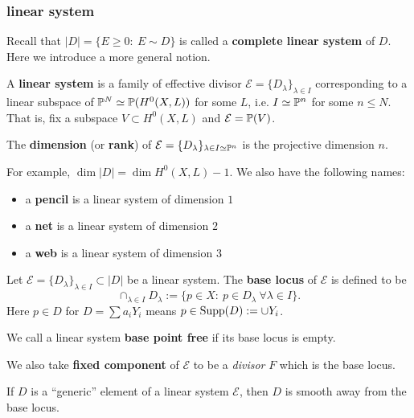 \subsubsection{linear system}

Recall that $|D|=\{E\geq 0:\ E\sim D\}$ is called a \textbf{complete linear system} of $D$. Here we introduce a more general notion.

\begin{definition}
A \textbf{linear system} is a family of effective divisor $\mathcal{E}=\{D_\lambda\}_{\lambda\in I}$ corresponding to a linear subspace of ${\mathbb P}^N\simeq {\mathbb P}(H^0(X,L))$ for some $L$, i.e. $I\simeq {\mathbb P}^n$ for some $n\leq N$. That is, fix a subspace $V\subset H^0(X,L)$ and $\mathcal{E}={\mathbb P}(V)$.
\end{definition}

\begin{definition}
The \textbf{dimension} (or \textbf{rank}) of $\mathcal{E}=\{D_\lambda\}_{\lambda\in I\simeq {\mathbb P}^n}$ is the projective dimension $n$.
\end{definition}

For example, $\dim|D|=\dim H^0(X,L)-1$. We also have the following names:
\begin{itemize}
\item a \textbf{pencil} is a linear system of dimension $1$
\item a \textbf{net} is a linear system of dimension $2$
\item a \textbf{web} is a linear system of dimension $3$
\end{itemize}

\begin{definition}
Let $\mathcal{E}=\{D_\lambda\}_{\lambda\in I}\subset |D|$ be a linear system. The \textbf{base locus} of $\mathcal{E}$ is defined to be
$$\cap_{\lambda\in I} D_\lambda :=\{p \in X:\ p \in D_\lambda\ \forall \lambda\in I\}.$$ 
Here $p \in D$ for $D=\sum{a_i Y_i}$ means $p \in {\rm Supp}(D) := \cup Y_i$.

We call a linear system \textbf{base point free} if its base locus is empty.

We also take \textbf{fixed component} of $\mathcal{E}$ to be a {\em divisor} $F$ which is the base locus. 
\end{definition}

\begin{theorem}[Bertini]
If $D$ is a ``generic'' element of a linear system $\mathcal{E}$, then $D$ is smooth away from the base locus.
\end{theorem}

